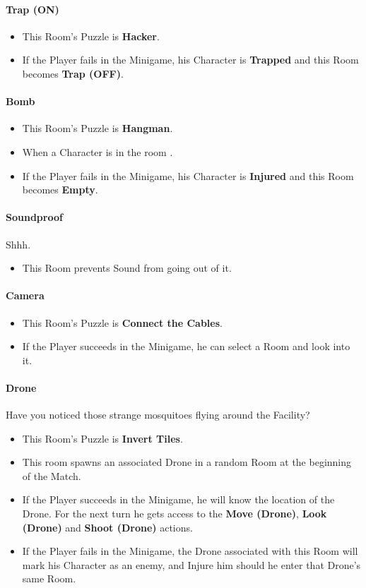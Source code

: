 \paragraph{Trap (ON)}
\begin{itemize}
	\item This Room's Puzzle is \textbf{Hacker}.
	\item If the Player fails    in the Minigame, his Character is \textbf{Trapped} and this Room becomes \textbf{Trap (OFF)}.
\end{itemize}

\paragraph{Bomb}
\begin{itemize}
	\item This Room's Puzzle is \textbf{Hangman}.
	\item When a Character is in the room .
	\item If the Player fails    in the Minigame, his Character is \textbf{Injured} and this Room becomes \textbf{Empty}.
\end{itemize}

\paragraph{Soundproof} Shhh.
\begin{itemize}
	\item This Room prevents Sound from going out of it.
\end{itemize}

\paragraph{Camera} 
\begin{itemize}
	\item This Room's Puzzle is \textbf{Connect the Cables}.
	\item If the Player succeeds in the Minigame, he can select a Room and look into it.
\end{itemize}

\paragraph{Drone} Have you noticed those strange mosquitoes flying around the Facility?
\begin{itemize}
	\item This Room's Puzzle is \textbf{Invert Tiles}.
	\item This room spawns an associated Drone in a random Room at the beginning of the Match.
	\item If the Player succeeds in the Minigame, he will know the location of the Drone. For the next turn he gets access to the \textbf{Move (Drone)}, \textbf{Look (Drone)} and \textbf{Shoot (Drone)} actions.
	\item If the Player fails    in the Minigame, the Drone associated with this Room will mark his Character as an enemy, and Injure him should he enter that Drone's same Room.
\end{itemize}

